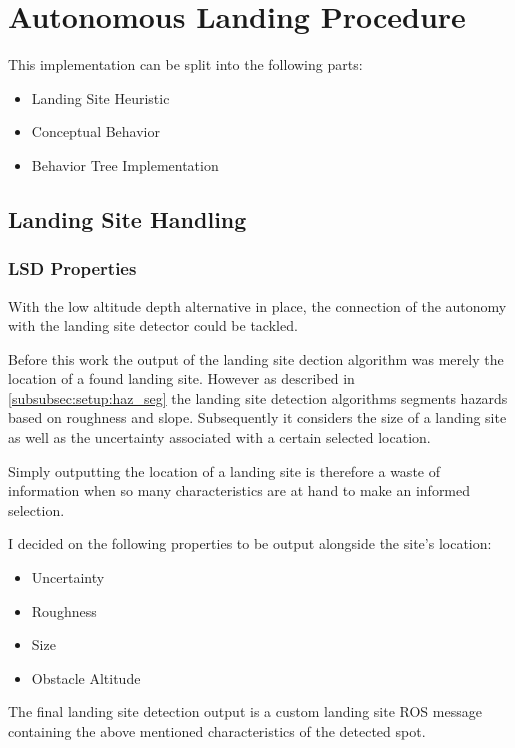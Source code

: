 \chapter{Autonomous Landing Procedure}\label{chapter:autonomous_landing_procedure}




This implementation can be split into the following parts:
\begin{itemize}
    \item Landing Site Heuristic
    \item Conceptual Behavior
    \item Behavior Tree Implementation
\end{itemize}



\section{Landing Site Handling}\label{subsubsec:LandingSiteHeuristic}

\subsection{LSD Properties}\label{sec:LSproperties}

With the low altitude depth alternative in place, the connection of the autonomy with the landing site detector could be tackled. 

Before this work the output of the landing site dection algorithm was merely the location of a found landing site. However as described in \cref{subsubsec:setup:haz_seg} the landing site detection algorithms segments hazards based on roughness and slope. Subsequently it considers the size of a landing site as well as the uncertainty associated with a certain selected location. 

Simply outputting the location of a landing site is therefore a waste of information when so many characteristics are at hand to make an informed selection. 

I decided on the following properties to be output alongside the site's location:

\begin{itemize}
    \item Uncertainty
    \item Roughness
    \item Size
    \item Obstacle Altitude
\end{itemize}
The final landing site detection output is a custom landing site ROS message containing the above mentioned characteristics of the detected spot.


